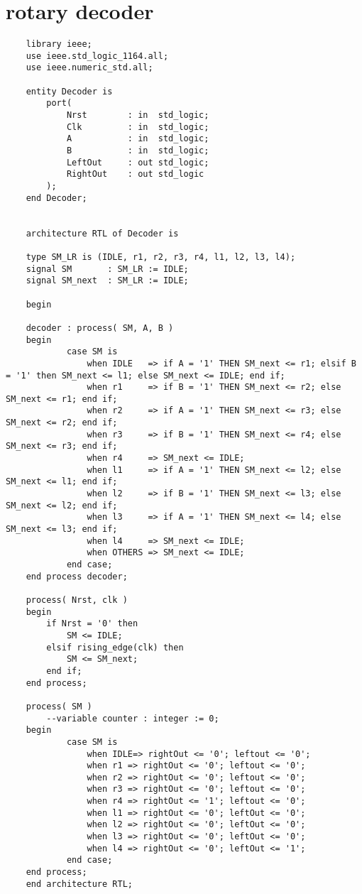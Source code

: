 \section*{rotary decoder}
\begin{lstlisting}
    library ieee;
    use ieee.std_logic_1164.all;
    use ieee.numeric_std.all;
    
    entity Decoder is
        port(
            Nrst		: in  std_logic;
            Clk     	: in  std_logic;
            A 			: in  std_logic;
            B 			: in  std_logic;
            LeftOut 	: out std_logic;
            RightOut 	: out std_logic
        );
    end Decoder;
    
    
    architecture RTL of Decoder is
    
    type SM_LR is (IDLE, r1, r2, r3, r4, l1, l2, l3, l4);
    signal SM 		: SM_LR := IDLE;
    signal SM_next 	: SM_LR := IDLE;
    
    begin
    
    decoder : process( SM, A, B )
    begin
            case SM is
                when IDLE 	=> if A = '1' THEN SM_next <= r1; elsif B = '1' then SM_next <= l1; else SM_next <= IDLE; end if;
                when r1 	=> if B = '1' THEN SM_next <= r2; else SM_next <= r1; end if;
                when r2 	=> if A = '1' THEN SM_next <= r3; else SM_next <= r2; end if;
                when r3 	=> if B = '1' THEN SM_next <= r4; else SM_next <= r3; end if;
                when r4		=> SM_next <= IDLE;
                when l1 	=> if A = '1' THEN SM_next <= l2; else SM_next <= l1; end if;
                when l2 	=> if B = '1' THEN SM_next <= l3; else SM_next <= l2; end if;
                when l3 	=> if A = '1' THEN SM_next <= l4; else SM_next <= l3; end if;
                when l4		=> SM_next <= IDLE;
                when OTHERS => SM_next <= IDLE;
            end case;
    end process decoder;
    
    process( Nrst, clk )
    begin
        if Nrst = '0' then
            SM <= IDLE;
        elsif rising_edge(clk) then
            SM <= SM_next;
        end if;
    end process;
    
    process( SM )
        --variable counter : integer := 0;
    begin
            case SM is
                when IDLE=> rightOut <= '0'; leftout <= '0';
                when r1	=> rightOut <= '0'; leftout <= '0';
                when r2	=> rightOut <= '0'; leftout <= '0';
                when r3	=> rightOut <= '0'; leftout <= '0';
                when r4	=> rightOut <= '1'; leftout <= '0';
                when l1	=> rightOut <= '0'; leftOut <= '0';
                when l2	=> rightOut <= '0'; leftOut <= '0';
                when l3	=> rightOut <= '0'; leftOut <= '0';
                when l4	=> rightOut <= '0'; leftOut <= '1';
            end case;
    end process;                                                                   
    end architecture RTL;
\end{lstlisting}

